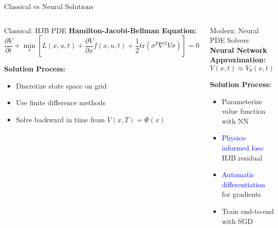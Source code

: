 \documentclass[aspectratio=169,xcolor=dvipsnames]{beamer}
\begin{document}
\begin{frame}{Classical vs Neural Solutions}
    \vspace{-0.5cm}
    \begin{columns}[t]
        \begin{alertblock}{Classical: HJB PDE}
            \vspace{-0.1cm}
            \small
            \textbf{Hamilton-Jacobi-Bellman Equation:}
            \begin{equation}
            \frac{\partial V}{\partial t} + \min_u \left[ L(x,u,t) + \frac{\partial V}{\partial x} f(x,u,t) + \frac{1}{2}\text{tr}(\sigma^T \nabla^2 V \sigma) \right] = 0
            \end{equation}
            
            \vspace{0.2cm}
            \textbf{Solution Process:}
            \begin{itemize}
                \item Discretize state space on grid
                \item Use finite difference methods
                \item Solve backward in time from $V(x,T) = \Phi(x)$
            \end{itemize}
        \end{alertblock}
        
        \begin{block}{Modern: Neural PDE Solvers}
            \vspace{-0.1cm}
            \small
            \textbf{Neural Network Approximation:}
            \begin{equation}
            V(x,t) \approx V_\theta(x,t)
            \end{equation}
            
            \vspace{0.2cm}
            \textbf{Solution Process:}
            \begin{itemize}
                \item Parameterize value function with NN
                \item \textcolor{blue}{Physics-informed loss}: HJB residual
                \item \textcolor{blue}{Automatic differentiation} for gradients
                \item Train end-to-end with SGD
            \end{itemize}
        \end{block}
    \end{columns}
    

\end{frame}
\end{document}
